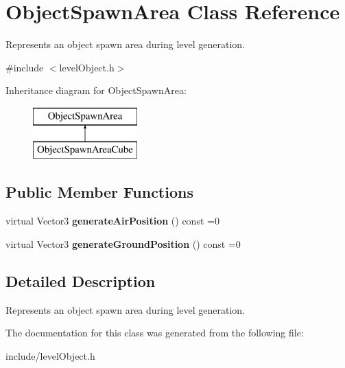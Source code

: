 \hypertarget{classObjectSpawnArea}{
\section{\-Object\-Spawn\-Area \-Class \-Reference}
\label{d1/d4d/classObjectSpawnArea}
}


\-Represents an object spawn area during level generation.  




{\ttfamily \#include $<$level\-Object.\-h$>$}

\-Inheritance diagram for \-Object\-Spawn\-Area\-:\begin{figure}[H]
\begin{center}
\leavevmode
\includegraphics[height=2.000000cm]{d1/d4d/classObjectSpawnArea}
\end{center}
\end{figure}
\subsection*{\-Public \-Member \-Functions}
\begin{DoxyCompactItemize}
\item 
\hypertarget{classObjectSpawnArea_a9209560304fced07ce3dfad9e1b28cb8}{
virtual \-Vector3 {\bfseries generate\-Air\-Position} () const =0}
\label{d1/d4d/classObjectSpawnArea_a9209560304fced07ce3dfad9e1b28cb8}

\item 
\hypertarget{classObjectSpawnArea_ae102398867acf729fe4d2874084e8192}{
virtual \-Vector3 {\bfseries generate\-Ground\-Position} () const =0}
\label{d1/d4d/classObjectSpawnArea_ae102398867acf729fe4d2874084e8192}

\end{DoxyCompactItemize}


\subsection{\-Detailed \-Description}
\-Represents an object spawn area during level generation. 

\-The documentation for this class was generated from the following file\-:\begin{DoxyCompactItemize}
\item 
include/level\-Object.\-h\end{DoxyCompactItemize}
